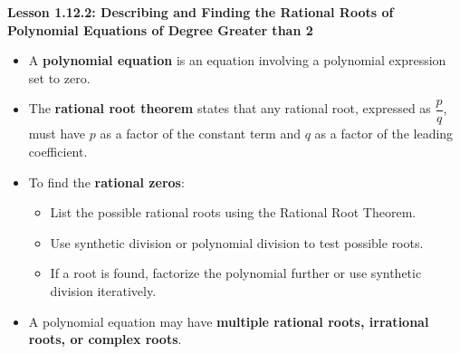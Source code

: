 \begin{center}
\textbf{Lesson 1.12.2: Describing and Finding the Rational Roots of Polynomial Equations of Degree Greater than 2}
\end{center}

\vspace*{-1.5ex}

\begin{itemize}
    \item A \textbf{polynomial equation} is an equation involving a polynomial expression set to zero.
    \item The \textbf{rational root theorem} states that any rational root, expressed as $\dfrac{p}{q}$, must have $p$ as a factor of the constant term and $q$ as a factor of the leading coefficient.
    \item To find the \textbf{rational zeros}:
    \begin{itemize}
        \item List the possible rational roots using the Rational Root Theorem.
        \item Use synthetic division or polynomial division to test possible roots.
        \item If a root is found, factorize the polynomial further or use synthetic division iteratively.
    \end{itemize}
    \item A polynomial equation may have \textbf{multiple rational roots, irrational roots, or complex roots}.
\end{itemize}
